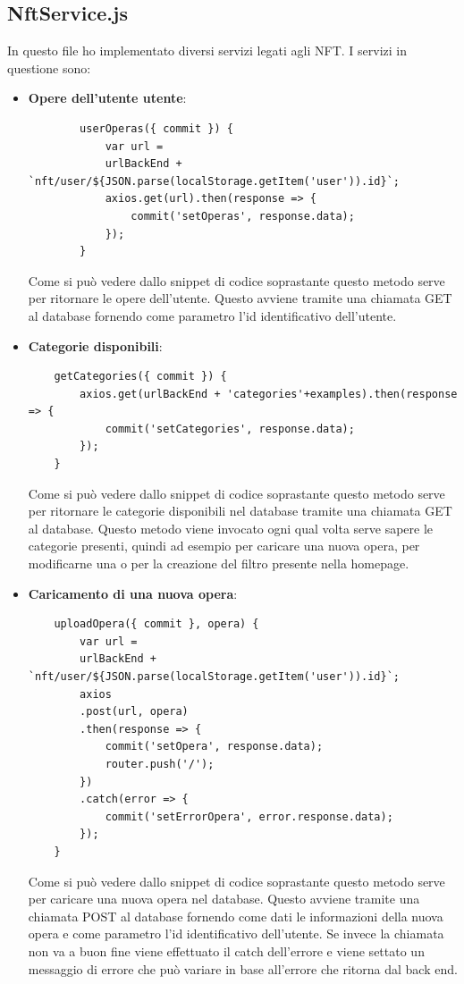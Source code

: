 \subsection{NftService.js}
In questo file ho implementato diversi servizi legati agli NFT. I servizi in questione sono:
\begin{itemize}
	\item \textbf{Opere dell'utente utente}:
	\begin{lstlisting}
		userOperas({ commit }) {
			var url =
			urlBackEnd + `nft/user/${JSON.parse(localStorage.getItem('user')).id}`;
			axios.get(url).then(response => {
				commit('setOperas', response.data);
			});
		}
	\end{lstlisting}
	Come si può vedere dallo snippet di codice soprastante questo metodo serve per ritornare le opere dell'utente. Questo avviene tramite una chiamata GET al database fornendo come parametro l'id identificativo dell'utente.
	\item \textbf{Categorie disponibili}:
	\begin{lstlisting}
	getCategories({ commit }) {
		axios.get(urlBackEnd + 'categories'+examples).then(response => {
			commit('setCategories', response.data);
		});
	}
	\end{lstlisting}
	Come si può vedere dallo snippet di codice soprastante questo metodo serve per ritornare le categorie disponibili nel database tramite una chiamata GET al database. Questo metodo viene invocato ogni qual volta serve sapere le categorie presenti, quindi ad esempio per caricare una nuova opera, per modificarne una o per la creazione del filtro presente nella homepage.
	\item \textbf{Caricamento di una nuova opera}:
	\begin{lstlisting}
	uploadOpera({ commit }, opera) {
		var url =
		urlBackEnd + `nft/user/${JSON.parse(localStorage.getItem('user')).id}`;
		axios
		.post(url, opera)
		.then(response => {
			commit('setOpera', response.data);
			router.push('/');
		})
		.catch(error => {
			commit('setErrorOpera', error.response.data);
		});
	}
	\end{lstlisting}
	Come si può vedere dallo snippet di codice soprastante questo metodo serve per caricare una nuova opera nel database. Questo avviene tramite una chiamata POST al database fornendo come dati le informazioni della nuova opera e come parametro l'id identificativo dell'utente. Se invece  la chiamata non va a buon fine viene effettuato il catch dell'errore e viene settato un messaggio di errore che può variare in base all'errore che ritorna dal back end.

\end{itemize}
